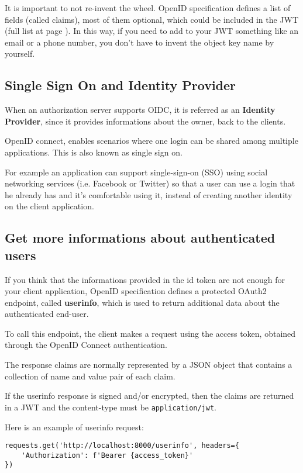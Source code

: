 It is important to not re-invent the wheel.
OpenID specification defines a list of fields (called claims), most of them
optional, which could be included in the JWT (full list at page \pageref{sec:openid-claims}).
In this way, if you need to add to your JWT something like an email or a phone number,
you don't have to invent the object key name by yourself.

\subsection{Single Sign On and Identity Provider}
When an authorization server supports OIDC, it is referred as an
\textbf{Identity Provider}, since it provides informations about the owner,
back to the clients.

OpenID connect, enables scenarios where one login can be shared among multiple
applications. This is also known as single sign on.

For example an application can support single-sign-on (SSO) using social networking services (i.e.
Facebook or Twitter) so that a user can use a login that he already has and it's
comfortable using it, instead of creating another identity on the client application.

\subsection{Get more informations about authenticated users}
If you think that the informations provided in the id token are not enough for
your client application, OpenID specification defines a protected OAuth2
endpoint, called \textbf{userinfo}, which is used to return additional data
about the authenticated end-user.

To call this endpoint, the client makes a request using the access token,
obtained through the OpenID Connect authentication.

The response claims are normally represented by a JSON object that contains a
collection of name and value pair of each claim.

If the userinfo response is signed and/or encrypted, then the claims are
returned in a JWT and the content-type must be \texttt{application/jwt}.

Here is an example of userinfo request:
\begin{lstlisting}
requests.get('http://localhost:8000/userinfo', headers={
    'Authorization': f'Bearer {access_token}'
})
\end{lstlisting}
